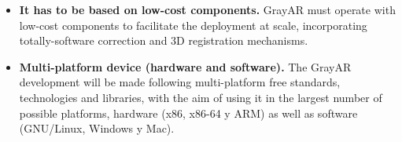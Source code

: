 \begin{itemize}
\item \textbf{It has to be based on low-cost components.} GrayAR must operate with low-cost components to facilitate the deployment at scale, incorporating totally-software correction and 3D registration mechanisms. 

\item \textbf{Multi-platform device (hardware and software).} The GrayAR development will be made following multi-platform free standards, technologies and libraries, with the aim of using it in the largest number of possible platforms, hardware (x86, x86-64 y ARM) as well as software (GNU/Linux, Windows y Mac).
\end{itemize}